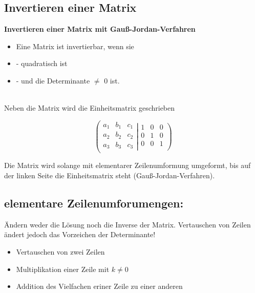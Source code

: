 \subsection{Invertieren einer Matrix}
\begin{boxedminipage}{\textwidth}
    \textbf{Invertieren einer Matrix mit Gauß-Jordan-Verfahren}
    \begin{itemize}
        \item Eine Matrix ist invertierbar, wenn sie
        \item - quadratisch ist
        \item - und die Determinante $\neq$ 0 ist.
    \end{itemize}
\end{boxedminipage}
\ \\

Neben die Matrix wird die Einheitsmatrix geschrieben

\[\left (
    \begin{array}{rrr}
        a_1 & b_1 & c_1 \\
        a_2 & b_2 & c_2 \\
        a_3 & b_3 & c_3 \\
    \end{array}
    \right .
    \left |
    \begin{array}{rrr}
        1 & 0 & 0 \\ 
        0 & 1 & 0 \\
        0 & 0 & 1 \\ 
    \end{array} \right )\]

Die Matrix wird solange mit elementarer Zeilenumformung umgeformt, bis auf der linken Seite die Einheitsmatrix steht (Gauß-Jordan-Verfahren). \\

\subsection{elementare Zeilenumforumengen:}  
Ändern weder die Lösung noch die Inverse der Matrix. Vertauschen von Zeilen ändert jedoch das Vorzeichen der Determinante!\\

\begin{itemize}
    \item Vertauschen von zwei Zeilen
    \item Multiplikation einer Zeile mit $k \neq 0$
    \item Addition des Vielfachen eriner Zeile zu einer anderen
\end{itemize}




